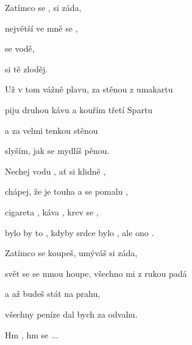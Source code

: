

\zs
Zatímco se ,  si záda,

 největší  ve mně se ,

 se  vodě,

 si tě  zloděj.
\ks

\zs
Už v tom vážně plavu, za stěnou z umakartu

piju druhou kávu a kouřím třetí Spartu

a za velmi tenkou stěnou

slyším, jak se mydlíš pěnou.
\ks

\zr
Nechej vodu ,  ať si klidně ,

chápej, že  je touha a  se pomalu ,

cigareta , káva , krev se ,

bylo by to , kdyby srdce bylo , ale ono .
\kr

\zs
Zatímco se koupeš, umýváš si záda,

svět se se mnou houpe, všechno mi z rukou padá

a až budeš stát na prahu,

všechny peníze dal bych za odvahu.
\ks

\zr
\kr

Hm  , hm   se ...

\kp





